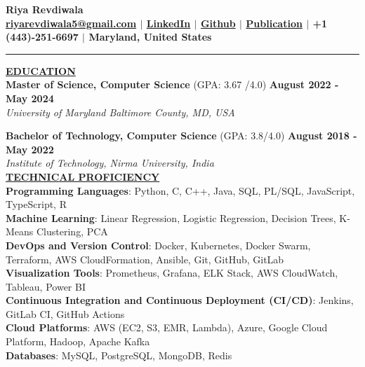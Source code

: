 \documentclass{article}
\begin{document}
\begin{center}
\thispagestyle{empty}
\large \textbf{Riya Revdiwala \\}
\normalsize \textbf{\href{mailto:riyarevdiwala5@gmail.com}{riyarevdiwala5@gmail.com} $\mid$ \href{https://www.linkedin.com/in/riya-revdiwala/}{LinkedIn} $\mid$ \href{https://github.com/riyarevdiwala}{Github} $\mid$ \href{https://www.igi-global.com/gateway/article/304726}{Publication} $\mid$ +1 (443)-251-6697 $\mid$ Maryland, United States \\}
\rule{\textwidth}{1pt}
\end{center}


\noindent \textbf{\underline{EDUCATION}} \\
\textbf{Master of Science, Computer Science} (GPA: 3.67 /4.0)  \hfill \textbf{August 2022 - May 2024} \\
\textit{University of Maryland Baltimore County, MD, USA}\\
\begin{itemize}[noitemsep,nolistsep,leftmargin=*]
\end{itemize}
\textbf{Bachelor of Technology, Computer Science} (GPA: 3.8/4.0) \hfill \textbf{August 2018 - May 2022} \\
\textit{Institute of Technology, Nirma University, India} \\


\noindent \textbf{\underline{TECHNICAL PROFICIENCY}} \\
\textbf{Programming Languages}{: \small Python, C, C++, Java, SQL, PL/SQL, JavaScript, TypeScript, R} \\
\textbf{Machine Learning}{: \small Linear Regression, Logistic Regression, Decision Trees, K-Means Clustering, PCA} \\
\textbf{DevOps and Version Control}{: \small Docker, Kubernetes, Docker Swarm, Terraform, AWS CloudFormation, Ansible, Git, GitHub, GitLab} \\
\textbf{Visualization Tools}{: \small Prometheus, Grafana, ELK Stack, AWS CloudWatch, Tableau, Power BI} \\
\textbf{Continuous Integration and Continuous Deployment (CI/CD)}{: \small Jenkins, GitLab CI, GitHub Actions} \\
\textbf{Cloud Platforms}{: \small AWS (EC2, S3, EMR, Lambda), Azure, Google Cloud Platform, Hadoop, Apache Kafka} \\
\textbf{Databases}{: \small MySQL, PostgreSQL, MongoDB, Redis} \\
\end{document}
